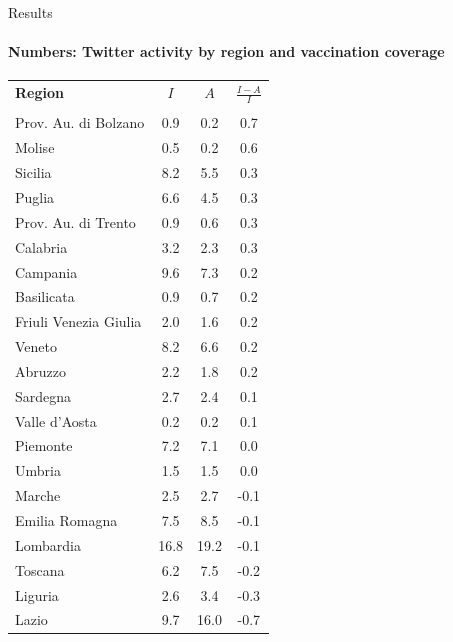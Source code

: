 \documentclass[9pt]{beamer}
\begin{document}
\begin{frame}{Results}
\framesubtitle{Numbers: Twitter activity by region and vaccination coverage}

 \begin{table}[b]
 \tiny
    \begin{minipage}[l]{0.4\textwidth}
        \begin{tabular*}{\linewidth}{@{\extracolsep{\fill}} l c c c}
       \textbf{Region}	&	\textbf{$I$}	&	\textbf{$A$} &	\textbf{$\frac{I- A}{I}$}	\\
 \colrule
       & & & \\
Prov. Au. di Bolzano	&	0.9	&	0.2	&	0.7	\\
Molise	&	0.5	&	0.2	&	0.6	\\
Sicilia	&	8.2	&	5.5	&	0.3	\\
Puglia	&	6.6	&	4.5	&	0.3	\\
Prov. Au. di Trento	&	0.9	&	0.6	&	0.3	\\
Calabria	&	3.2	&	2.3	&	0.3	\\
Campania	&	9.6	&	7.3	&	0.2	\\
Basilicata	&	0.9	&	0.7	&	0.2	\\
Friuli Venezia Giulia	&	2.0	&	1.6	&	0.2	\\
Veneto	&	8.2	&	6.6	&	0.2	\\
Abruzzo	&	2.2	&	1.8	&	0.2	\\
Sardegna	&	2.7	&	2.4	&	0.1	\\
Valle d'Aosta	&	0.2	&	0.2	&	0.1	\\
Piemonte	&	7.2	&	7.1	&	0.0	\\
Umbria	&	1.5	&	1.5	&	0.0	\\
Marche	&	2.5	&	2.7	&	-0.1	\\
Emilia Romagna	&	7.5	&	8.5	&	-0.1	\\
Lombardia	&	16.8	&	19.2	&	-0.1	\\
Toscana	&	6.2	&	7.5	&	-0.2	\\
Liguria	&	2.6	&	3.4	&	-0.3	\\
Lazio	&	9.7	&	16.0	&	-0.7	\\


\end{tabular*}
\end{minipage}
\end{table}
\end{frame}
\end{document}
